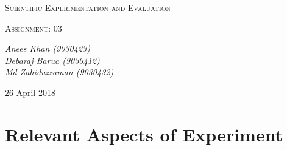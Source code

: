 \documentclass[10pt,a4paper]{article}
\begin{document}
			\begin{titlepage}
			\centering
		
				{\scshape\LARGE Scientific Experimentation and Evaluation\par}
		
				{\scshape\Large Assignment: 03\par}
		
				\vfill
		
				\vfill
				{\Large\itshape Anees Khan (9030423)
					\\Debaraj Barua (9030412)\\
					Md Zahiduzzaman (9030432)
					\par}
				\vfill
		
				{\large 26-April-2018\par}
			\end{titlepage}
			\tableofcontents
			\listoffigures	
			\listoftables
			\newpage
			\section{Relevant Aspects of Experiment}
\end{document}
